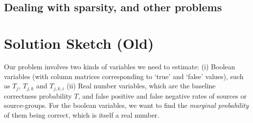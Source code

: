 \documentclass{sig-alternate}
\newcounter{prob}
\begin{document}

\subsection{Dealing with sparsity, and other problems}












































\section{Solution Sketch (Old)}
Our problem involves two kinds of variables we need to estimate: (i) Boolean variables (with column matrices corresponding to `true' and `false' values), such as $T_j$, $T_{j,k}$ and $T_{j,k,i}$ (ii) Real number variables, which are the baseline correctness probability $T$, and false positive and false negative rates of sources or source-groups. For the boolean variables, we want to find the \textit{marginal probability} of them being correct, which is itself a real number. 
\end{document}

